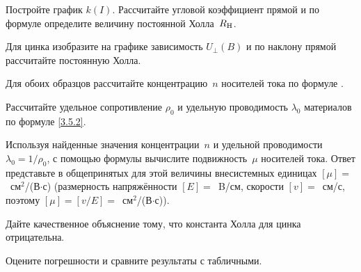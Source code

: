 \begin{lab:task}
\item Постройте график $k(I)$. Рассчитайте угловой коэффициент прямой 
и по формуле  определите величину постоянной Холла~$R_{\rm H}$.

\item Для цинка изобразите на графике зависимость $U_{\perp}(B)$ и по наклону 
прямой рассчитайте постоянную Холла.

\item Для обоих образцов рассчитайте концентрацию~$n$ носителей тока по формуле
.

\item Рассчитайте удельное сопротивление $\rho_0$ и удельную 
проводимость $\lambda_0$ материалов по формуле \eqref{3.5.2}.

\item Используя найденные значения концентрации~$n$ и удельной проводимости
$\lambda_0=1/\rho_0$, с помощью формулы  вычислите 
подвижность~$\mu$ носителей тока. Ответ представьте в общепринятых для этой величины 
внесистемных единицах $[\mu]=$~см$^2$/(В$\cdot$с)
(размерность напряжённости $[E]=$~B/см, скорости $[v]=$~см/с,
поэтому $[\mu]=[v/E]=$~см$^2$/(В$\cdot$с)).

\item Дайте качественное объяснение тому, что константа Холла для
цинка отрицательна.

\item Оцените погрешности и сравните результаты с табличными.

\end{lab:task}



